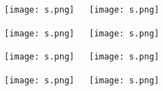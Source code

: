 \documentclass[12pt]{article}
\begin{document}
\centerline{\texttt{[image: s.png]}~~~\texttt{[image: s.png]}}

\centerline{\texttt{[image: s.png]}~~~\texttt{[image: s.png]}}

\centerline{\texttt{[image: s.png]}~~~\texttt{[image: s.png]}}


\centerline{\texttt{[image: s.png]}~~~\texttt{[image: s.png]}}
\end{document}
